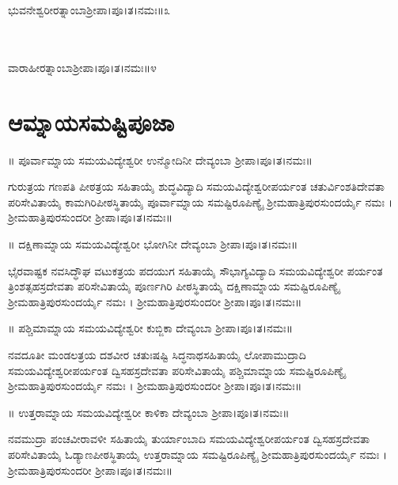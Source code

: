 \\
\\
ಭುವನೇಶ್ವರೀರತ್ನಾಂಬಾಶ್ರೀಪಾ।ಪೂ।ತ।ನಮಃ॥೩

\\
\\
ವಾರಾಹೀರತ್ನಾಂಬಾಶ್ರೀಪಾ।ಪೂ।ತ।ನಮಃ॥೪
\section{ಆಮ್ನಾಯಸಮಷ್ಟಿಪೂಜಾ}
॥ ಪೂರ್ವಾಮ್ನಾಯ ಸಮಯವಿದ್ಯೇಶ್ವರೀ ಉನ್ಮೋದಿನೀ ದೇವ್ಯಂಬಾ ಶ್ರೀಪಾ।ಪೂ।ತ।ನಮಃ॥

ಗುರುತ್ರಯ ಗಣಪತಿ ಪೀಠತ್ರಯ ಸಹಿತಾಯೈ ಶುದ್ಧವಿದ್ಯಾದಿ ಸಮಯವಿದ್ಯೇಶ್ವರೀಪರ್ಯಂತ ಚತುರ್ವಿಂಶತಿದೇವತಾ ಪರಿಸೇವಿತಾಯೈ ಕಾಮಗಿರಿಪೀಠಸ್ಥಿತಾಯೈ  ಪೂರ್ವಾಮ್ನಾಯ ಸಮಷ್ಟಿರೂಪಿಣ್ಯೈ ಶ್ರೀಮಹಾತ್ರಿಪುರಸುಂದರ್ಯೈ ನಮಃ । ಶ್ರೀಮಹಾತ್ರಿಪುರಸುಂದರೀ ಶ್ರೀಪಾ।ಪೂ।ತ।ನಮಃ॥

॥ ದಕ್ಷಿಣಾಮ್ನಾಯ ಸಮಯವಿದ್ಯೇಶ್ವರೀ ಭೋಗಿನೀ ದೇವ್ಯಂಬಾ ಶ್ರೀಪಾ।ಪೂ।ತ।ನಮಃ॥

ಭೈರವಾಷ್ಟಕ ನವಸಿದ್ಧೌಘ ವಟುಕತ್ರಯ ಪದಯುಗ ಸಹಿತಾಯೈ ಸೌಭಾಗ್ಯವಿದ್ಯಾದಿ ಸಮಯವಿದ್ಯೇಶ್ವರೀ ಪರ್ಯಂತ ತ್ರಿಂಶತ್ಸಹಸ್ರದೇವತಾ ಪರಿಸೇವಿತಾಯೈ ಪೂರ್ಣಗಿರಿ ಪೀಠಸ್ಥಿತಾಯೈ ದಕ್ಷಿಣಾಮ್ನಾಯ ಸಮಷ್ಟಿರೂಪಿಣ್ಯೈ ಶ್ರೀಮಹಾತ್ರಿಪುರಸುಂದರ್ಯೈ ನಮಃ । ಶ್ರೀಮಹಾತ್ರಿಪುರಸುಂದರೀ ಶ್ರೀಪಾ।ಪೂ।ತ।ನಮಃ॥

॥ ಪಶ್ಚಿಮಾಮ್ನಾಯ ಸಮಯವಿದ್ಯೇಶ್ವರೀ ಕುಬ್ಜಿಕಾ ದೇವ್ಯಂಬಾ ಶ್ರೀಪಾ।ಪೂ।ತ।ನಮಃ॥

ನವದೂತೀ ಮಂಡಲತ್ರಯ ದಶವೀರ ಚತುಃಷಷ್ಟಿ ಸಿದ್ಧನಾಥಸಹಿತಾಯೈ ಲೋಪಾಮುದ್ರಾದಿ ಸಮಯವಿದ್ಯೇಶ್ವರೀಪರ್ಯಂತ ದ್ವಿಸಹಸ್ರದೇವತಾ ಪರಿಸೇವಿತಾಯೈ ಪಶ್ಚಿಮಾಮ್ನಾಯ ಸಮಷ್ಟಿರೂಪಿಣ್ಯೈ ಶ್ರೀಮಹಾತ್ರಿಪುರಸುಂದರ್ಯೈ ನಮಃ । ಶ್ರೀಮಹಾತ್ರಿಪುರಸುಂದರೀ ಶ್ರೀಪಾ।ಪೂ।ತ।ನಮಃ॥

॥ ಉತ್ತರಾಮ್ನಾಯ ಸಮಯವಿದ್ಯೇಶ್ವರೀ ಕಾಳಿಕಾ ದೇವ್ಯಂಬಾ ಶ್ರೀಪಾ।ಪೂ।ತ।ನಮಃ॥

ನವಮುದ್ರಾ ಪಂಚವೀರಾವಳೀ ಸಹಿತಾಯೈ ತುರ್ಯಾಂಬಾದಿ ಸಮಯವಿದ್ಯೇಶ್ವರೀಪರ್ಯಂತ ದ್ವಿಸಹಸ್ರದೇವತಾ ಪರಿಸೇವಿತಾಯೈ ಓಡ್ಯಾಣಪೀಠಸ್ಥಿತಾಯೈ ಉತ್ತರಾಮ್ನಾಯ ಸಮಷ್ಟಿರೂಪಿಣ್ಯೈ ಶ್ರೀಮಹಾತ್ರಿಪುರಸುಂದರ್ಯೈ ನಮಃ । ಶ್ರೀಮಹಾತ್ರಿಪುರಸುಂದರೀ ಶ್ರೀಪಾ।ಪೂ।ತ।ನಮಃ॥


